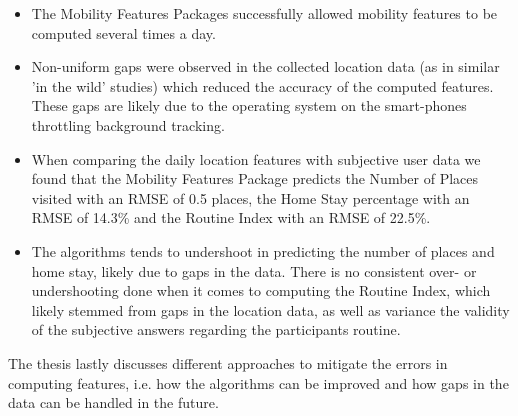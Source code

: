\begin{itemize}
    \item The Mobility Features Packages successfully allowed mobility features to be computed several times a day.
    
    \item Non-uniform gaps were observed in the collected location data (as in similar 'in the wild' studies) which reduced the accuracy of the computed features. These gaps are likely due to the operating system on the smart-phones throttling background tracking.
    
    \item When comparing the daily location features with subjective user data we found that the Mobility Features Package predicts the Number of Places visited with an RMSE of 0.5 places, the Home Stay percentage with an RMSE of 14.3\% and the Routine Index with an RMSE of 22.5\%.
    
    \item The algorithms tends to undershoot in predicting the number of places and home stay, likely due to gaps in the data. There is no consistent over- or undershooting done when it comes to computing the Routine Index, which likely stemmed from gaps in the location data, as well as variance the validity of the subjective answers regarding the participants routine.
\end{itemize}

The thesis lastly  discusses different approaches to mitigate the errors in computing features, i.e. how the algorithms can be improved and how gaps in the data can be handled in the future. 